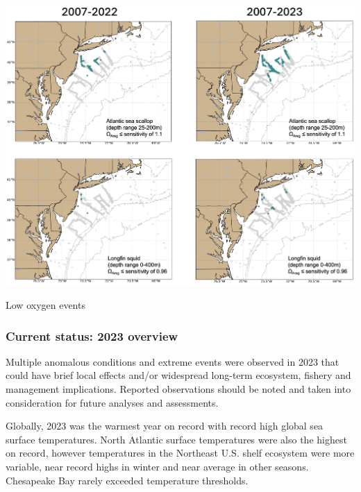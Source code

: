 \documentclass[
  10pt,
]{article}
\let\origfigure\figure
\let\endorigfigure\endfigure
\renewenvironment{figure}[1][2] {
    \expandafter\origfigure\expandafter[H]
} {
    \endorigfigure
}
\begin{document}
\begin{figure}

{\centering \includegraphics[width=1\linewidth]{SOE-NEFMC_files/figure-latex/oa-spp-1} 

}

\caption{Locations where bottom aragonite saturation state ($\Omega_{Arag}$; summer only: June-August) were at or below the laboratory-derived sensitivity level for Atlantic sea scallop (top panels) and longfin squid (bottom panels) for the time periods 2007-2022 (left panels) and 2007-2023 (right panels). Gray circles indicate locations where carbonate chemistry samples were collected, but bottom $\Omega_{Arag}$ values were higher than sensitivity values determined for that species.}\label{fig:oa-spp}
\end{figure}

Low oxygen events

\hypertarget{current-status-2023-overview}{%
\subsubsection{Current status: 2023 overview}\label{current-status-2023-overview}}

Multiple anomalous conditions and extreme events were observed in 2023 that could have brief local effects and/or widespread long-term ecosystem, fishery and management implications. Reported observations should be noted and taken into consideration for future analyses and assessments.

Globally, 2023 was the warmest year on record with record high global sea surface temperatures. North Atlantic surface temperatures were also the highest on record, however temperatures in the Northeast U.S. shelf ecosystem were more variable, near record highs in winter and near average in other seasons. Chesapeake Bay rarely exceeded temperature thresholds.
\end{document}
